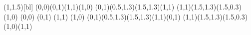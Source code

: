 \savebox{\cube}(1,1.5)[bl]{%
  \roundjoin
  \color{white}
  \polygon*(0,0)(0,1)(1,1)(1,0)
  \color{lightgray}
  \polygon*(0,1)(0.5,1.3)(1.5,1.3)(1,1)
  \color{gray}
  \polygon*(1,1)(1.5,1.3)(1.5,0.3)(1,0)
  \color{black}
  \moveto(0,0)
  \lineto(0,1) \lineto(1,1) \lineto(1,0)
  \closepath
  \strokepath
  \polyline(0,1)(0.5,1.3)(1.5,1.3)(1,1)(0,1)
  \polyline(1,1)(1.5,1.3)(1.5,0.3)(1,0)(1,1)
}
